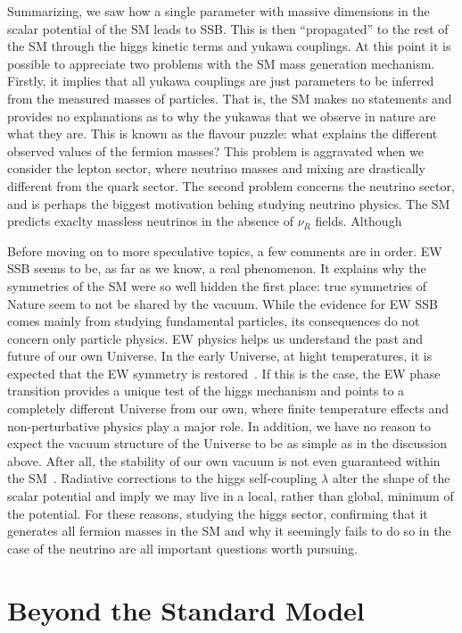 Summarizing, we saw how a single parameter with massive dimensions in the scalar potential of the SM leads to SSB. This is then ``propagated'' to the rest of the SM through the higgs kinetic terms and yukawa couplings. At this point it is possible to appreciate two problems with the SM mass generation mechanism. Firstly, it implies that all yukawa couplings are just parameters to be inferred from the measured masses of particles. That is, the SM makes no statements and provides no explanations as to why the yukawas that we observe in nature are what they are. This is known as the flavour puzzle: what explains the different observed values of the fermion masses? This problem is aggravated when we consider the lepton sector, where neutrino masses and mixing are drastically different from the quark sector. The second problem concerns the neutrino sector, and is perhaps the biggest motivation behing studying neutrino physics. The SM predicts exaclty massless neutrinos in the absence of $\nu_R$ fields. Although  

Before moving on to more speculative topics, a few comments are in order. EW SSB seems to be, as far as we know, a real phenomenon. It explains why the symmetries of the SM were so well hidden the first place: true symmetries of Nature seem to not be shared by the vacuum. While the evidence for EW SSB comes mainly from studying fundamental particles, its consequences do not concern only particle physics. EW physics helps us understand the past and future of our own Universe. In the early Universe, at hight temperatures, it is expected that the EW symmetry is restored~\cite{Kirzhnits:1972ut,Dolan:1973qd,Weinberg:1974hy}. If this is the case, the EW phase transition provides a unique test of the higgs mechanism and points to a completely different Universe from our own, where finite temperature effects and non-perturbative physics play a major role. In addition, we have no reason to expect the vacuum structure of the Universe to be as simple as in the discussion above. After all, the stability of our own vacuum is not even guaranteed within the SM~\cite{Cabibbo:1979ay,Degrassi:2012ry}. Radiative corrections to the higgs self-coupling $\lambda$ alter the shape of the scalar potential and imply we may live in a local, rather than global, minimum of the potential. For these reasons, studying the higgs sector, confirming that it generates all fermion masses in the SM and why it seemingly fails to do so in the case of the neutrino are all important questions worth pursuing.

\section{Beyond the Standard Model}

